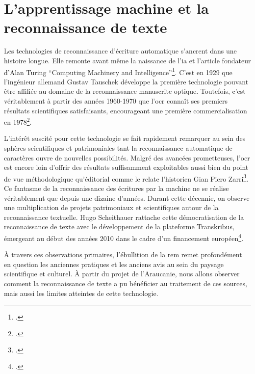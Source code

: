 	
	
	
	\chapter{L'apprentissage machine et la reconnaissance de texte}
	
	Les technologies de reconnaissance d'écriture automatique s'ancrent dans une histoire longue. Elle remonte avant même la naissance de l'\gls{ia} et l'article fondateur d'Alan Turing \enquote{Computing Machinery and Intelligence}\footcite{turingComputingMachineryIntelligence1950}. C'est en 1929 que l'ingénieur allemand Gustav Tauschek développe la première technologie pouvant être affiliée au domaine de la reconnaissance manuscrite optique. Toutefois, c'est véritablement à partir des années 1960-1970 que l'\gls{ocr} connaît ses premiers résultats scientifiques satisfaisants, encourageant une première commercialisation en 1978\footcite{alkhalafOCRBasedElectronicDocumentation2014}.
	
	L'intérêt suscité pour cette technologie se fait rapidement remarquer au sein des sphères scientifiques et patrimoniales tant la reconnaissance automatique de caractères ouvre de nouvelles possibilités. Malgré des avancées prometteuses, l'\gls{ocr} est encore loin d'offrir des résultats suffisamment exploitables aussi bien du point de vue méthodologique qu'éditorial comme le relate l'historien Gian Piero Zarri\footcite{zarriQuelquesAspectsTechniques1977}. Ce fantasme de la reconnaissance des écritures par la machine ne se réalise véritablement que depuis une dizaine d'années. Durant cette décennie, on observe une multiplication de projets patrimoniaux et scientifiques autour de la reconnaissance textuelle. Hugo Scheithauer rattache cette démocratisation de la reconnaissance de texte avec le développement de la plateforme Transkribus, émergeant au début des années 2010 dans le cadre d'un financement européen\footcite{scheithauerReconnaissanceEntitesNommees2021}.
	
	À travers ces observations primaires, l'ébullition de la \gls{rem} remet profondément en question les anciennes pratiques et les anciens avis au sein du paysage scientifique et culturel. À partir du projet de l'Araucanie, nous allons observer comment la reconnaissance de texte a pu bénéficier au traitement de ces sources, mais aussi les limites atteintes de cette technologie.
	
